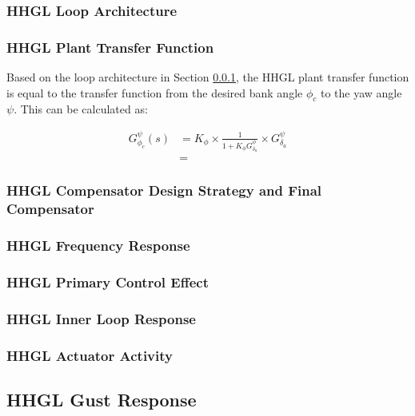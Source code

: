 \subsubsection{HHGL Loop Architecture}\label{sec:HHGL_architecture}

\subsubsection{HHGL Plant Transfer Function}

Based on the loop architecture in Section \ref{sec:HHGL_architecture}, the HHGL plant transfer function is equal to the transfer function from the desired bank angle $\phi_c$ to the yaw angle $\psi$. This can be calculated as:

\begin{align*}
G_{\phi_c}^\psi (s) &= K_\phi \times \frac{1}{1 + K_\phi G_{\delta_a}^\phi} \times G_{\delta_a}^\psi \\
&= 
\end{align*}

\subsubsection{HHGL Compensator Design Strategy and Final Compensator}

\subsubsection{HHGL Frequency Response}

\subsubsection{HHGL Primary Control Effect}

\subsubsection{HHGL Inner Loop Response}

\subsubsection{HHGL Actuator Activity}

\subsection{HHGL Gust Response}

